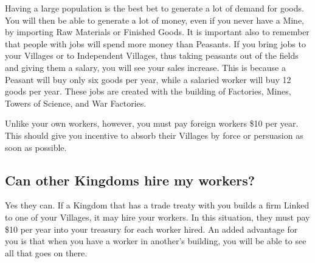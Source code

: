 Having a large population is the best bet to generate a lot of demand for goods. You will then be able to generate a lot of money, even if you never have a Mine, by importing Raw Materials or Finished Goods. It is important also to remember that people with jobs will spend more money than Peasants. If you bring jobs to your Villages or to Independent Villages, thus taking peasants out of the fields and giving them a salary, you will see your sales increase. This is because a Peasant will buy only six goods per year, while a salaried worker will buy 12 goods per year. These jobs are created with the building of Factories, Mines, Towers of Science, and War Factories.

Unlike your own workers, however, you must pay foreign workers \$10 per year. This should give you incentive to absorb their Villages by force or persuasion as soon as possible.

\subsection{Can other Kingdoms hire my workers?}

Yes they can. If a Kingdom that has a trade treaty with you builds a firm Linked to one of your Villages, it may hire your workers. In this situation, they must pay \$10 per year into your treasury for each worker hired. An added advantage for you is that when you have a worker in another’s building, you will be able to see all that goes on there.